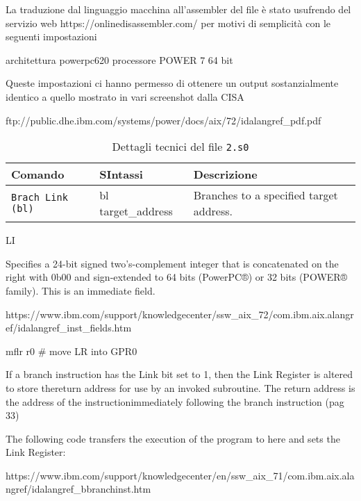 \documentclass[10pt,a4paper, titlepage]{report}
\begin{document}
La traduzione dal linguaggio macchina all'assembler del file è stato usufrendo del servizio web https://onlinedisassembler.com/ per motivi di semplicità con le seguenti impostazioni

architettura powerpc620
processore POWER 7
64 bit

Queste impostazioni ci hanno permesso di ottenere un output sostanzialmente identico a quello mostrato in vari screenshot dalla CISA




ftp://public.dhe.ibm.com/systems/power/docs/aix/72/idalangref\_pdf.pdf

\begin{table}[h!]
  \begin{center}
    \caption{Dettagli tecnici del file \texttt{2.s0}}
    \centering
    \label{tab:table55}
    
    \begin{tabular}{l|l|l}
      \toprule
        Comando & SIntassi & Descrizione \\
    \midrule
        \texttt{Brach Link (bl)} & bl target\_address & Branches to a specified target address. \\
      
      
      
    
 	
      \bottomrule
    \end{tabular}
   
  \end{center}
\end{table}


    LI
    
 	Specifies a 24-bit signed two's-complement integer that is concatenated on the right with 0b00 and sign-extended to 64 bits (PowerPC®) or 32 bits (POWER® family). This is an immediate field.

 	https://www.ibm.com/support/knowledgecenter/ssw\_aix\_72/com.ibm.aix.alangref/idalangref\_inst\_fields.htm
 	
 	mflr r0 \# move LR into GPR0
 	
 	 If a branch instruction has the Link bit set to 1, then the Link Register is altered to store thereturn address for use by an invoked subroutine. The return address is the address of the instructionimmediately following the branch instruction (pag 33)


The following code transfers the execution of the program to here and sets the Link Register: 

https://www.ibm.com/support/knowledgecenter/en/ssw\_aix\_71/com.ibm.aix.alangref/idalangref\_bbranchinst.htm


\listoffigures
\listoftables
\lstlistoflistings
\end{document}
